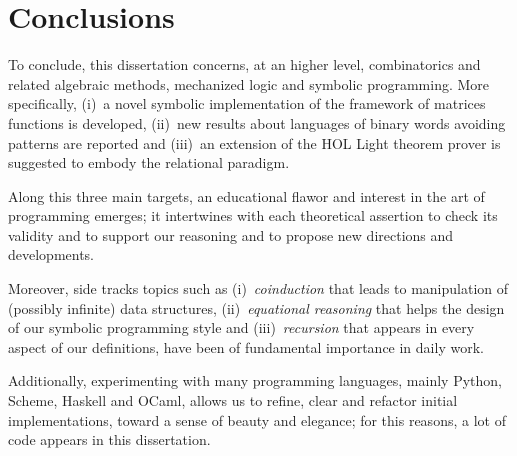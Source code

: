 \documentclass[a4paper, 10pt]{article}
\begin{document}
\section*{Conclusions}

To conclude, this dissertation concerns, at an higher level, combinatorics and
related algebraic methods, mechanized logic and symbolic programming.  More
specifically, (i)~a novel symbolic implementation of the framework of matrices
functions is developed, (ii)~new results about languages of binary words
avoiding patterns are reported and (iii)~an extension of the HOL Light theorem
prover is suggested to embody the relational paradigm.

Along this three main targets, an educational flawor and interest in the art of
programming emerges; it intertwines with each theoretical assertion to check
its validity and to support our reasoning and to propose new directions and
developments.

Moreover, side tracks topics such as (i)~\textit{coinduction} that leads to
manipulation of (possibly infinite) data structures, (ii)~\textit{equational
reasoning} that helps the design of our symbolic programming style and
(iii)~\textit{recursion} that appears in every aspect of our definitions, have
been of fundamental importance in daily work.

Additionally, experimenting with many programming languages, mainly Python,
Scheme, Haskell and OCaml, allows us to refine, clear and refactor initial
implementations, toward a sense of beauty and elegance; for this reasons, a lot
of code appears in this dissertation.




\end{document}
